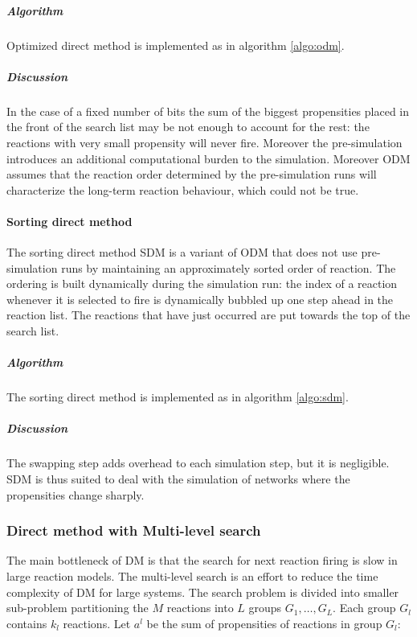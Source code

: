         \subparagraph{Algorithm}
        Optimized direct method is implemented as in algorithm \ref{algo:odm}.

        

        \subparagraph{Discussion}
        In the case of a fixed number of bits the sum of the biggest propensities placed in the front of the search list may be not enough to account for the rest: the reactions with very small propensity will never fire.
        Moreover the pre-simulation introduces an additional computational burden to the simulation.
        Moreover ODM assumes that the reaction order determined by the pre-simulation runs will characterize the long-term reaction behaviour, which could not be true.

      \paragraph{Sorting direct method}
      The sorting direct method SDM is a variant of ODM that does not use pre-simulation runs by maintaining an approximately sorted order of reaction.
      The ordering is built dynamically during the simulation run: the index of a reaction whenever it is selected to fire is dynamically bubbled up one step ahead in the reaction list.
      The reactions that have just occurred are put towards the top of the search list.

        \subparagraph{Algorithm}
        The sorting direct method is implemented as in algorithm \ref{algo:sdm}.

        

        \subparagraph{Discussion}
        The swapping step adds overhead to each simulation step, but it is negligible.
        SDM is thus suited to deal with the simulation of networks where the propensities change sharply.

    \subsubsection{Direct method with Multi-level search}
    The main bottleneck of DM is that the search for next reaction firing is slow in large reaction models.
    The multi-level search is an effort to reduce the time complexity of DM for large systems.
    The search problem is divided into smaller sub-problem partitioning the $M$ reactions into $L$ groups $G_1, \dots, G_L$.
    Each group $G_l$ contains $k_l$ reactions.
    Let $a^l$ be the sum of propensities of reactions in group $G_l$:

